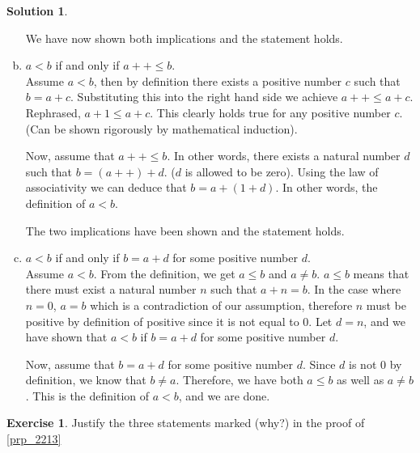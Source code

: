 \documentclass[a4paper, twocolumn]{report}
\newcounter{exercise} \numberwithin{exercise}{section}
\theoremstyle{definition}
\newtheorem{exc}[exercise]{Exercise}
\theoremstyle{solution}
\newtheorem*{sltn}{Solution}
\newcommand{\dplus}{{+}{+}} %
\begin{document}
\begin{sltn}
\begin{enumerate}[(a)]
      We have now shown both implications and the statement holds.

    \item $a < b$ if and only if $a\dplus \leq b$.\\
      [0.2cm]
      Assume $a < b$, then by definition there exists a positive number $c$
      such that $ b = a + c$.  Substituting this into the right hand side we
      achieve $a\dplus \leq a + c$. Rephrased, $a + 1 \leq a + c$. This clearly
      holds true for any positive number $c$. (Can be shown rigorously by
      mathematical induction).

      Now, assume that $a\dplus \leq b$. In other words, there exists a natural
      number $d$ such that $ b = (a\dplus) + d$. ($d$ is allowed to be zero).
      Using the law of associativity we can deduce that $b = a + (1 + d)$. In
      other words, the definition of $ a < b$.

      The two implications have been shown and the statement holds.
    
    \item $a < b$ if and only if $b = a + d$ for some positive number $d$.\\
      [0.2cm]
      Assume $a < b$. From the definition, we get $a \leq b$ and $ a \neq b$.
      $a \leq b$ means that there must exist a natural number $n$ such that $a
      + n = b$.  In the case where $n = 0$, $a = b$ which is a contradiction of
      our assumption, therefore $n$ must be positive by definition of positive
      since it is not equal to $0$.  Let $d = n$, and we have shown that $a <
      b$ if $b = a + d$ for some positive number $d$.

      Now, assume that $b = a + d$ for some positive number $d$. Since $d$ is
      not $0$ by definition, we know that $b \neq a$. Therefore, we have both $
      a \leq b$ as well as $a \neq b$.  This is the definition of $a < b$, and
      we are done.
  \end{enumerate}
\end{sltn}

\begin{exc}
  Justify the three statements marked (why?) in the proof of \ref{prp_2213} 
\end{exc}
\end{document}
